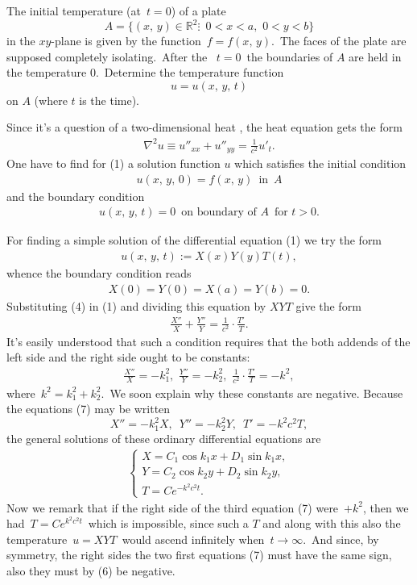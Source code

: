 \documentclass[12pt]{article}
\theoremstyle{definition}
\begin{document}
The initial temperature (at\, $t = 0$) of a  plate
   $$A = \{(x,\,y)\in\mathbb{R}^2\vdots\,\,\,0 < x < a,\,\,0 < y < b\}$$
in the $xy$-plane is given by the function\, $f = f(x,\,y)$.\, The faces of the plate are supposed completely isolating.\, After the \, $t = 0$\, the boundaries of $A$ are held in the temperature $0$.\, Determine the temperature function
                         $$u = u(x,\,y,\,t)$$
on $A$ (where $t$ is the time).

Since it's a question of a two-dimensional heat , the heat equation gets the form
\begin{align}
  \nabla^2u \equiv u''_{xx}+u''_{yy} = \frac{1}{c^2}u'_t.
\end{align}
One have to find for (1) a solution function $u$ which satisfies the initial condition
\begin{align}
  u(x,\,y,\,0) = f(x,\,y)\,\,\,\mathrm{in}\,\,\,A
\end{align}
and the boundary condition
\begin{align}
  u(x,\,y,\,t) = 0\,\,\,     \mathrm{on\,\,boundary\,\,of}\,\,A\,\,\,\mathrm{for}\,\,t > 0.
\end{align}

For finding a simple solution of the differential equation (1) we try the form
\begin{align}
u(x,\,y,\,t) := X(x)Y(y)T(t),
\end{align}
whence the boundary condition reads
\begin{align}
X(0) = Y(0) = X(a) = Y(b) = 0.
\end{align}
Substituting (4) in (1) and dividing this equation by $XYT$ give the form
\begin{align}
\frac{X''}{X}+\frac{Y''}{Y} = \frac{1}{c^2}\!\cdot\!\frac{T'}{T}.
\end{align}
It's easily understood that such a condition requires that the both addends of the left side and the right side ought to be constants:
\begin{align}
\frac{X''}{X} = -k_1^2,\,\, \frac{Y''}{Y} = -k_2^2,\,\, 
\frac{1}{c^2}\!\cdot\!\frac{T'}{T} = -k^2,
\end{align}
where\, $k^2 = k_1^2+k_2^2$.\, We soon explain why these constants are negative.
Because the equations (7) may be written
$$X'' = -k_1^2X,\,\,\, Y'' = -k_2^2Y,\,\,\, T' = -k^2c^2T,$$ 
the general solutions of these ordinary differential equations are
\begin{align}
\begin{cases}
 X = C_1\cos{k_1x}+D_1\sin{k_1x},\\
 Y = C_2\cos{k_2y}+D_2\sin{k_2y},\\
 T = Ce^{-k^2c^2t}.
\end{cases}
\end{align}
Now we remark that if the right side of the third equation (7) were\, $+k^2$, then we had\, $T = Ce^{k^2c^2t}$\, which is impossible, since such a $T$ and along with this also the temperature\, $u = XYT$\, would ascend infinitely when\, $t\to\infty$.\, And since, by symmetry, the right sides the two first equations (7) must have the same sign, also they must by (6) be negative.
\end{document}

